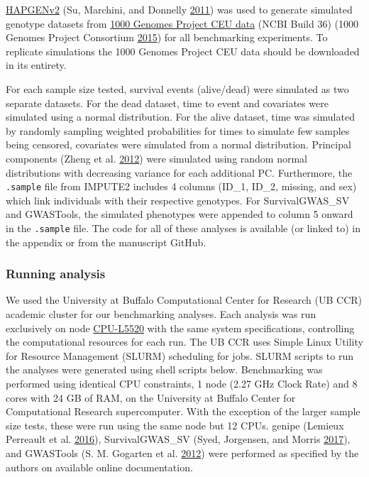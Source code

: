 \documentclass[]{DissertateOSU}
\begin{document}
\href{http://mathgen.stats.ox.ac.uk/genet\%20dics_software/hapgen/hapgen2.html}{HAPGENv2}
(Su, Marchini, and Donnelly \protect\hyperlink{ref-hapgen2}{2011}) was
used to generate simulated genotype datasets from
\href{https://mathgen.stats.ox.ac.uk/impute/impute_v1.html\#Using_IMPUTE_with_the_HapMap_Data}{1000
Genomes Project CEU data} (NCBI Build 36) (1000 Genomes Project
Consortium \protect\hyperlink{ref-1000genomes}{2015}) for all
benchmarking experiments. To replicate simulations the 1000 Genomes
Project CEU data should be downloaded in its entirety.

For each sample size tested, survival events (alive/dead) were simulated
as two separate datasets. For the dead dataset, time to event and
covariates were simulated using a normal distribution. For the alive
dataset, time was simulated by randomly sampling weighted probabilities
for times to simulate few samples being censored, covariates were
simulated from a normal distribution. Principal components (Zheng et al.
\protect\hyperlink{ref-snprelate}{2012}) were simulated using random
normal distributions with decreasing variance for each additional PC.
Furthermore, the \texttt{.sample} file from IMPUTE2 includes 4 columns
(ID\_1, ID\_2, missing, and sex) which link individuals with their
respective genotypes. For SurvivalGWAS\_SV and GWASTools, the simulated
phenotypes were appended to column 5 onward in the \texttt{.sample}
file. The code for all of these analyses is available (or linked to) in
the appendix or from the manuscript GitHub.

\subsubsection{Running analysis}\label{running-analysis}

We used the University at Buffalo Computational Center for Research (UB
CCR) academic cluster for our benchmarking analyses. Each analysis was
run exclusively on node
\href{https://www.buffalo.edu/ccr/support/research_facilities/general_compute.html}{CPU-L5520}
with the same system specifications, controlling the computational
resources for each run. The UB CCR uses Simple Linux Utility for
Resource Management (SLURM) scheduling for jobs. SLURM scripts to run
the analyses were generated using shell scripts below. Benchmarking was
performed using identical CPU constraints, 1 node (2.27 GHz Clock Rate)
and 8 cores with 24 GB of RAM, on the University at Buffalo Center for
Computational Research supercomputer. With the exception of the larger
sample size tests, these were run using the same node but 12 CPUs.
genipe (Lemieux Perreault et al. \protect\hyperlink{ref-genipe}{2016}),
SurvivalGWAS\_SV (Syed, Jorgensen, and Morris
\protect\hyperlink{ref-survivalgwas_sv}{2017}), and GWASTools (S. M.
Gogarten et al. \protect\hyperlink{ref-gwastools}{2012}) were performed
as specified by the authors on available online documentation.
\end{document}

